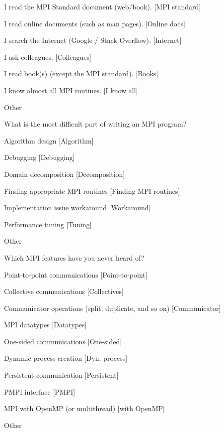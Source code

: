 \documentclass[preprint,5p,times]{elsarticle}
\begin{document}
{{\begin{description}
\begin{inparaenum}[{\bf C}1)]
    \item I read the MPI Standard document (web/book). [MPI standard]
    \item I read online documents (such as man pages). [Online docs]
    \item I search the Internet (Google / Stack Overflow). [Internet]
    \item I ask colleagues. [Colleagues]
    \item I read book(s) (except the MPI standard). [Books]
    \item I know almost all MPI routines. [I know all]
    \item Other
    \end{inparaenum}
  \item[Q15:] What is the most difficult part of writing an MPI program?
    \begin{inparaenum}[{\bf C}1)]
    \item Algorithm design [Algorithm]
    \item Debugging [Debugging]
    \item Domain decomposition [Decomposition]
    \item Finding appropriate MPI routines [Finding MPI routines]
    \item Implementation issue workaround [Workaround]
    \item Performance tuning [Tuning]
    \item Other
    \end{inparaenum}
  \item[Q16*:] Which MPI features have you never heard of?
    \begin{inparaenum}[{\bf C}1)]
    \item Point-to-point communications [Point-to-point]
    \item Collective communications [Collectives]
    \item Communicator operations (split, duplicate, and so on) [Communicator]
    \item MPI datatypes [Datatypes]
    \item One-sided communications [One-sided]
    \item Dynamic process creation [Dyn. process]
    \item Persistent communication [Persistent]
    \item PMPI interface [PMPI]
    \item MPI with OpenMP (or multithread) [with OpenMP]
    \item Other
    \end{inparaenum}

\end{description}}}
\end{document}
